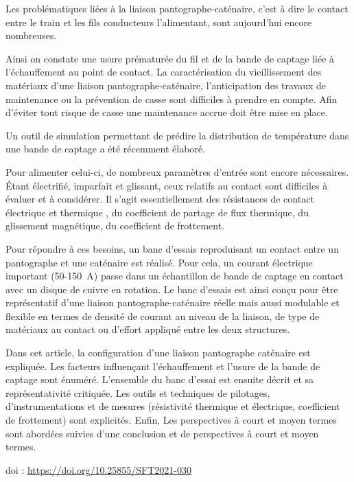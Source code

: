 {\normalsize
Les problématiques liées  à la liaison pantographe-caténaire, c'est à dire le contact entre le train et les fils conducteurs l'alimentant, sont aujourd'hui encore nombreuses.



    Ainsi on constate une usure prématurée du fil et de la bande de captage liée à l'échauffement au point de contact. La caractérisation du vieillissement des matériaux d'une liaison pantographe-caténaire, l'anticipation des travaux de maintenance ou la prévention de casse sont difficiles à prendre en compte. Afin d'éviter tout risque de casse une maintenance accrue doit être mise en place. 



    Un outil de simulation permettant de prédire la distribution de température dans une bande de captage a été récemment élaboré.



    Pour alimenter celui-ci, de nombreux paramètres d'entrée sont encore nécessaires. Étant électrifié, imparfait et glissant, ceux relatifs au contact sont difficiles à évaluer et à considérer. Il s'agit essentiellement des résistances de contact électrique et thermique , du coefficient de partage de flux thermique, du glissement magnétique, du coefficient de frottement.



    



    Pour répondre à ces besoins, un banc d'essais reproduisant un contact entre un pantographe et une caténaire est réalisé. Pour cela, un courant électrique important (50-150~A) passe dans un échantillon de bande de captage en contact avec un disque de cuivre en rotation. Le banc d'essais est ainsi conçu pour être représentatif d'une liaison pantographe-caténaire réelle mais aussi modulable et flexible en termes de densité de courant au niveau de la liaison, de type de matériaux au contact ou d'effort appliqué entre les deux structures. 



    Dans cet article, la configuration d'une liaison pantographe caténaire est expliquée. Les facteurs influençant l'échauffement et l'usure de la bande de captage sont énuméré. L'ensemble du banc d'essai est ensuite décrit et sa représentativité critiquée. Les outils et techniques de pilotages, d'instrumentations et de mesures (résistivité thermique et électrique, coefficient de frottement) sont explicités. Enfin, Les perspectives à court et moyen termes sont abordées suivies d'une conclusion et de perspectives à court et moyen termes.

 \vfill doi : \url{https://doi.org/10.25855/SFT2021-030}

}
 
